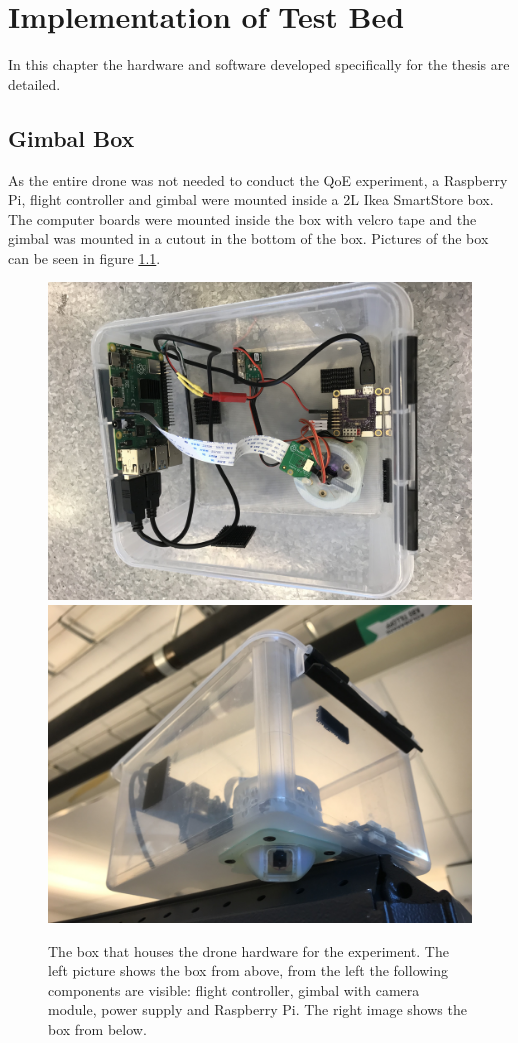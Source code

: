 \documentclass[nofilelist]{cslthse-msc}
\begin{document}
\chapter{Implementation of Test Bed}
In this chapter the hardware and software developed specifically for the thesis are detailed.

\section{Gimbal Box}
As the entire drone was not needed to conduct the QoE experiment, a Raspberry Pi, flight controller and gimbal were mounted inside a 2L Ikea SmartStore box. The computer boards were mounted inside the box with velcro tape and the gimbal was mounted in a cutout in the bottom of the box. Pictures of the box can be seen in figure \ref{fig:drone-setup}.

\begin{figure}[htp]
   \centering
   \includegraphics[width=.47\textwidth]{images/drone-box-1.jpg}\hfill
   \includegraphics[width=.47\textwidth]{images/drone-box-2.jpg}
   \caption{The box that houses the drone hardware for the experiment. The left picture shows the box from above, from the left the following components are visible: flight controller, gimbal with camera module, power supply and Raspberry Pi. The right image shows the box from below.}
   \label{fig:drone-setup}
\end{figure}
\end{document}
